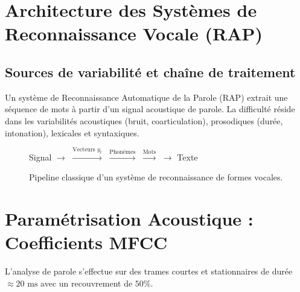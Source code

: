 \minitoc 


\section{Architecture des Systèmes de Reconnaissance Vocale (RAP)}

\subsection{Sources de variabilité et chaîne de traitement}

Un système de Reconnaissance Automatique de la Parole (RAP) extrait une séquence de mots à partir d'un signal acoustique de parole. La difficulté réside dans les variabilités acoustiques (bruit, coarticulation), prosodiques (durée, intonation), lexicales et syntaxiques.

\begin{figure}[htbp]
    \centering
    \small
    \textsf{Signal} $\longrightarrow$  $\xrightarrow{\text{Vecteurs } y_t}$  $\xrightarrow{\text{Phonèmes}}$  $\xrightarrow{\text{Mots}}$  $\longrightarrow$ \textsf{Texte}
    \caption{Pipeline classique d'un système de reconnaissance de formes vocales.}
\end{figure}


\section{Paramétrisation Acoustique : Coefficients MFCC}

L'analyse de parole s'effectue sur des trames courtes et stationnaires de durée $\approx 20\text{ ms}$ avec un recouvrement de $50\%$.

